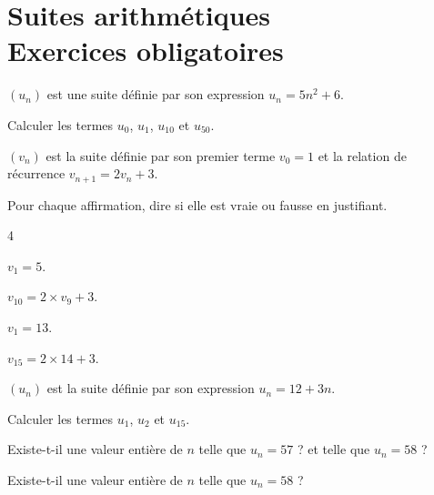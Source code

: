 \documentclass[12pt,a4paper]{book}
\begin{document}
\graphicspath{{images/}}
\chapter[Suites - Exercices]{Suites arithmétiques \\ Exercices obligatoires}
\thispagestyle{fancy}


\exerciceDS{}

$(u_n)$ est une suite définie par son expression $u_n=5n^2+6$.

\begin{itemMet}
	\item Calculer les termes $u_0$, $u_1$, $u_{10}$ et $u_{50}$.
\end{itemMet}

\exerciceDS{}

$(v_n)$ est la suite définie par son premier terme $v_0=1$ et la relation de récurrence $v_{n+1}=2v_n+3$.

Pour chaque affirmation, dire si elle est vraie ou fausse en justifiant.
\begin{multicols}{4}
\begin{enumMet}
	\item $v_1=5$.
	\item $v_{10}=2\times v_9+3$.
	\item $v_1=13$.
	\item $v_{15}=2\times 14+3$.
\end{enumMet}
\end{multicols}

\exerciceDS{}

$(u_n)$ est la suite définie par son expression $u_n=12+3n$.
\begin{enumMet}
	\item Calculer les termes $u_1$, $u_2$ et $u_{15}$.
	\item Existe-t-il une valeur entière de $n$ telle que $u_n=57$ ? et telle que $u_n=58$ ?
	\item Existe-t-il une valeur entière de $n$ telle que $u_n=58$ ?
\end{enumMet}

\exerciceDS{}
\end{document}

